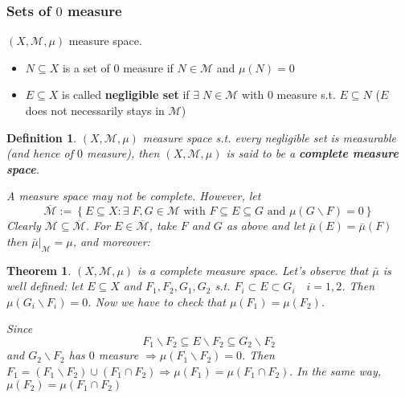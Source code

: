 \documentclass[a4paper,12pt]{article}
\theoremstyle{break}
\newtheorem{theorem}{Theorem}[section]
\newtheorem{definition}{Definition}[section]
\newcommand{\measurespace}{(X, \mathcal{M}, \mu)}
\numberwithin{equation}{section}
\begin{document}
\subsubsection*{Sets of \(0\) measure}
\((X, \mathcal{M}, \mu)\) measure space.
\begin{itemize}
    \item \(N \subseteq X\) is a set of \(0\) measure if \(N \in \mathcal{M}\) and \(\mu(N) = 0\)
    \item \(E \subseteq X\) is called \textbf{negligible set} if \(\exists \; N \in \mathcal{M}\) with \(0\) measure s.t. \(E \subseteq N\) (\(E\) does not necessarily stays in \(\mathcal{M}\))
\end{itemize} 
\begin{definition}
    \((X, \mathcal{M}, \mu)\) measure space s.t. every negligible set is measurable (and hence of \(0\) measure), then \(\measurespace\) is said to be a \textbf{complete measure space}.

    A measure space may not be complete. However, let 
    \[
        \overline{\mathcal{M}} := \left\lbrace E \subseteq X : \exists\; F, G \in \mathcal{M} \mbox{ with } F\subseteq E \subseteq G \mbox{ and } \mu(G\backslash F) = 0\right\rbrace
    \]
    Clearly \(\mathcal{M} \subseteq \overline{\mathcal{M}}\). For \(E \in \overline{\mathcal{M}}\), take \(F\) and \(G\) as above and let \(\bar{\mu}(E) = \bar{\mu}(F)\) then \(\bar{\mu}\vert_{\mathcal{M}} = \mu\), and moreover:
\end{definition}
\begin{theorem}
    \(\measurespace\) is a complete measure space. Let's observe that \(\bar{\mu}\) is well defined: let \(E \subseteq X\) and \(F_1,F_2, G_1, G_2\) s.t. \(F_i \subset E \subset G_i \quad i = 1,2\). Then \(\mu(G_i\backslash F_i) = 0\). Now we have to check that \(\mu(F_1) = \mu(F_2)\). 

    Since \[
        F_1 \backslash F_2 \subseteq E\backslash F_2 \subseteq G_2 \backslash F_2
    \] 
    and \(G_2 \backslash F_2\) has \(0\) measure \(\Longrightarrow \mu(F_1 \backslash F_2) = 0\). Then \(F_1 = (F_1 \backslash F_2) \cup (F_1 \cap F_2) \Longrightarrow \mu(F_1) = \mu(F_1 \cap F_2).\) In the same way, \(\mu(F_2) = \mu(F_1 \cap F_2)\)
\end{theorem}
\end{document}
